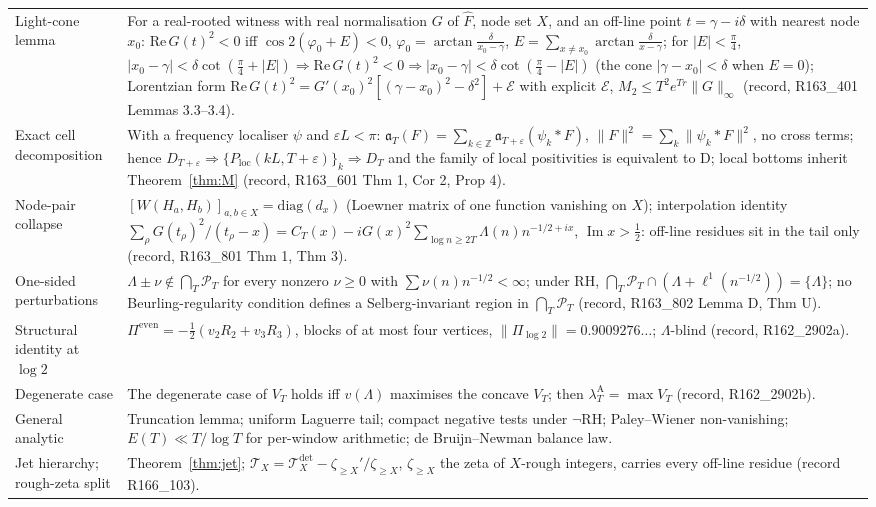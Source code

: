 \documentclass[11pt]{amsart}
\theoremstyle{definition}
\theoremstyle{remark}
\newcommand{\Z}{\mathbb Z}
\newcommand{\Iml}{\operatorname{Im}}
\newcommand{\PT}{\mathcal P_T}
\newcommand{\lamA}{\lambda^{\mathrm A}_T}
\begin{document}
\begin{longtable}{@{}p{4.2cm}p{10.3cm}@{}}
Light-cone lemma & For a real-rooted witness with real normalisation $G$ of $\widehat F$, node set $X$, and an off-line point $t=\gamma-i\delta$ with nearest node $x_0$: $\mathrm{Re}\,G(t)^2<0$ iff $\cos2(\varphi_0+E)<0$, $\varphi_0=\arctan\frac{\delta}{x_0-\gamma}$, $E=\sum_{x\ne x_0}\arctan\frac{\delta}{x-\gamma}$; for $|E|<\frac\pi4$, $|x_0-\gamma|<\delta\cot(\frac\pi4+|E|)\Rightarrow\mathrm{Re}\,G(t)^2<0\Rightarrow|x_0-\gamma|<\delta\cot(\frac\pi4-|E|)$ (the cone $|\gamma-x_0|<\delta$ when $E=0$); Lorentzian form $\mathrm{Re}\,G(t)^2=G'(x_0)^2[(\gamma-x_0)^2-\delta^2]+\mathcal E$ with explicit $\mathcal E$, $M_2\le T^2e^{Tr}\|G\|_\infty$ (record, R163\_401 Lemmas 3.3--3.4). \\
Exact cell decomposition & With a frequency localiser $\psi$ and $\varepsilon L<\pi$: $\mathfrak a_T(F)=\sum_{k\in\Z}\mathfrak a_{T+\varepsilon}(\psi_k*F)$, $\|F\|^2=\sum_k\|\psi_k*F\|^2$, no cross terms; hence $D_{T+\varepsilon}\Rightarrow\{P_{\mathrm{loc}}(kL,T+\varepsilon)\}_k\Rightarrow D_T$ and the family of local positivities is equivalent to D; local bottoms inherit Theorem~\ref{thm:M} (record, R163\_601 Thm 1, Cor 2, Prop 4). \\
Node-pair collapse & $[W(H_a,H_b)]_{a,b\in X}=\mathrm{diag}(d_x)$ (Loewner matrix of one function vanishing on $X$); interpolation identity $\sum_\rho G(t_\rho)^2/(t_\rho-x)=C_T(x)-iG(x)^2\sum_{\log n\ge2T}\Lambda(n)n^{-1/2+ix}$, $\Iml x>\frac12$: off-line residues sit in the tail only (record, R163\_801 Thm 1, Thm 3). \\
One-sided perturbations & $\Lambda\pm\nu\notin\bigcap_T\PT$ for every nonzero $\nu\ge0$ with $\sum\nu(n)n^{-1/2}<\infty$; under RH, $\bigcap_T\PT\cap(\Lambda+\ell^1(n^{-1/2}))=\{\Lambda\}$; no Beurling-regularity condition defines a Selberg-invariant region in $\bigcap_T\PT$ (record, R163\_802 Lemma D, Thm U). \\
Structural identity at $\log2$ & $\Pi^{\mathrm{even}}=-\frac12(v_2R_2+v_3R_3)$, blocks of at most four vertices, $\|\Pi_{\log2}\|=0.9009276\ldots$; $\Lambda$-blind (record, R162\_2902a). \\
Degenerate case & The degenerate case of $V_T$ holds iff $v(\Lambda)$ maximises the concave $V_T$; then $\lamA=\max V_T$ (record, R162\_2902b). \\
General analytic & Truncation lemma; uniform Laguerre tail; compact negative tests under $\neg$RH; Paley--Wiener non-vanishing; $E(T)\ll T/\log T$ for per-window arithmetic; de Bruijn--Newman balance law. \\
Jet hierarchy; rough-zeta split & Theorem~\ref{thm:jet}; $\mathcal T_X=\mathcal T^{\mathrm{det}}_X-\zeta_{\ge X}'/\zeta_{\ge X}$, $\zeta_{\ge X}$ the zeta of $X$-rough integers, carries every off-line residue (record R166\_103). \\

\end{longtable}
\end{document}
